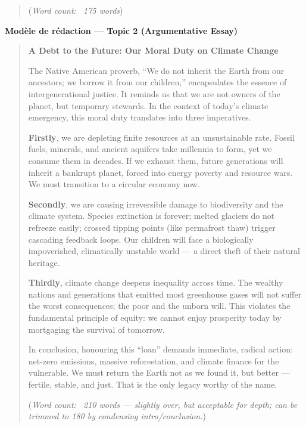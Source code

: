 \documentclass[11pt]{article}
\begin{document}
\begin{corrige}
\begin{quote}
(\textit{Word count: ~175 words})
\end{quote}

\textbf{Modèle de rédaction — Topic 2 (Argumentative Essay)}

\begin{quote}
\textbf{A Debt to the Future: Our Moral Duty on Climate Change}

The Native American proverb, “We do not inherit the Earth from our ancestors; we borrow it from our children,” encapsulates the essence of intergenerational justice. It reminds us that we are not owners of the planet, but temporary stewards. In the context of today’s climate emergency, this moral duty translates into three imperatives.

\textbf{Firstly}, we are depleting finite resources at an unsustainable rate. Fossil fuels, minerals, and ancient aquifers take millennia to form, yet we consume them in decades. If we exhaust them, future generations will inherit a bankrupt planet, forced into energy poverty and resource wars. We must transition to a circular economy now.

\textbf{Secondly}, we are causing irreversible damage to biodiversity and the climate system. Species extinction is forever; melted glaciers do not refreeze easily; crossed tipping points (like permafrost thaw) trigger cascading feedback loops. Our children will face a biologically impoverished, climatically unstable world — a direct theft of their natural heritage.

\textbf{Thirdly}, climate change deepens inequality across time. The wealthy nations and generations that emitted most greenhouse gases will not suffer the worst consequences; the poor and the unborn will. This violates the fundamental principle of equity: we cannot enjoy prosperity today by mortgaging the survival of tomorrow.

In conclusion, honouring this “loan” demands immediate, radical action: net-zero emissions, massive reforestation, and climate finance for the vulnerable. We must return the Earth not as we found it, but better — fertile, stable, and just. That is the only legacy worthy of the name.

(\textit{Word count: ~210 words — slightly over, but acceptable for depth; can be trimmed to 180 by condensing intro/conclusion.})
\end{quote}


\end{corrige}
\end{document}
